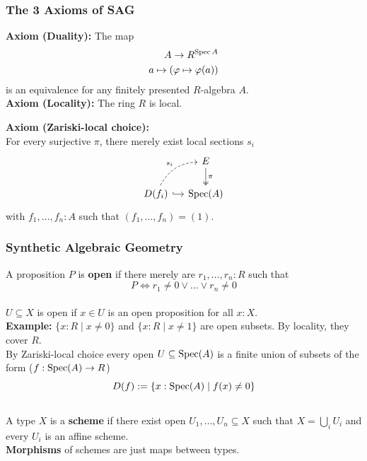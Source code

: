 \documentclass{beamer}
\begin{document}
\begin{frame}
  \frametitle{The 3 Axioms of SAG}
    \textbf{Axiom (Duality):}
    The map
    \begin{align*}
      A \to R^{\operatorname{Spec} A} \\
      a\mapsto (\varphi\mapsto \varphi(a))
    \end{align*}
    is an equivalence
    for any finitely presented $R$-algebra $A$. \\
  \pause
  \vspace{1.5mm}
  \textbf{Axiom (Locality):} The ring $R$ is local.

  \vspace{1.5mm}
  \textbf{Axiom (Zariski-local choice):}\\
  For every surjective $\pi$, there merely exist local sections $s_i$
  \[ \begin{tikzcd}[ampersand replacement=\&, column sep=small]
    \& E \ar[d, two heads, "\pi"] \\
    D(f_i) \ar[r, hook] \ar[ur, bend left, dashed, "s_i"] \& \Spec(A)
  \end{tikzcd} \]
  with $f_1, \dots, f_n : A$ such that $(f_1,\dots,f_n)=(1)$.
\end{frame}

\begin{frame}
  \frametitle{\textbf{Synthetic Algebraic Geometry}}
  A proposition $P$ is \textbf{open} if there merely are $r_1,\dots,r_n:R$
  such that
  \[ P \Leftrightarrow r_1\neq 0 \vee \dots \vee r_n\neq 0\] \\
  \pause
  $U\subseteq X$ is open if $x\in U$ is an open proposition for all $x:X$. \\
  \pause
  \textbf{Example:} $\{x:R\mid x\neq 0\}$ and $\{x:R\mid x\neq 1\}$ are open subsets. By locality, they cover $R$. \\
  \vspace{5mm}
  \pause
  By Zariski-local choice every open $U\subseteq \operatorname{Spec}(A)$ is a finite union of subsets of the form ($f:\operatorname{Spec}(A)\to R$)
  \[ D(f) := \{x:\operatorname{Spec}(A) \mid f(x)\neq 0 \} \] \\
  \pause
  A type $X$ is a \textbf{scheme} if
  there exist open $U_1, \dots, U_n \subseteq X$
  such that $X = \bigcup_i U_i$
  and every $U_i$ is an affine scheme. \\
  \vspace{5mm}
  \pause
  \textbf{Morphisms} of schemes are just maps between types.
  
\end{frame}
\end{document}
